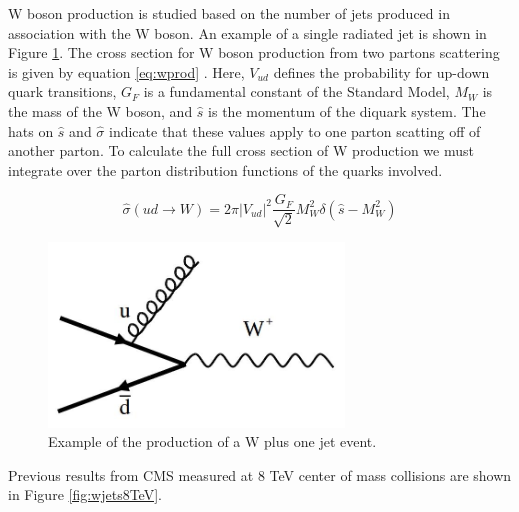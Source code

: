 \documentclass[oneside, letterpaper, oldfontcommands]{memoir}
\begin{document}
\qquad W boson production is studied based on the number of jets produced in association with the W boson. An example of a single radiated jet is shown in Figure \ref{fig:WOneJet}. The cross section for W boson production from two partons scattering is given by equation \ref{eq:wprod} \cite{Barger:0201058766}. Here, $V_{ud}$ defines the probability for up-down quark transitions, $G_{F}$ is a fundamental constant of the Standard Model, $M_{W}$ is the mass of the W boson, and $\hat{s}$ is the momentum of the diquark system. The hats on $\hat{s}$ and $\hat{\sigma}$ indicate that these values apply to one parton scatting off of another parton. To calculate the full cross section of W production we must integrate over the parton distribution functions of the quarks involved.

\begin{equation} \label{eq:wprod}
\hat{\sigma}(u d \rightarrow W) = 2\pi |V_{ud}|^{2}\frac{G_{F}}{\sqrt{2}}M_{W}^{2}\delta(\hat{s} - M_{W}^{2})
\end{equation}

\begin{figure}[here]
\includegraphics[width=0.7\textwidth]{WOneJet.jpg}
\caption{Example of the production of a W plus one jet event.}
\label{fig:WOneJet}
\end{figure}

Previous results from CMS measured at 8 TeV center of mass collisions\cite{Khachatryan:2014uva} are shown in Figure \ref{fig:wjets8TeV}. 
\end{document}
